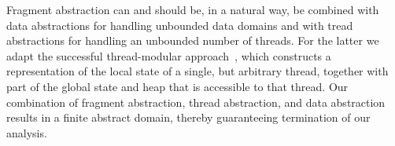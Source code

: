 Fragment abstraction can and should be, in a natural way,
be combined with data abstractions for
handling unbounded data domains and with tread abstractions
for handling an unbounded number of threads.
For the latter we adapt
the successful thread-modular approach~\cite{BLMRS:cav08}, which constructs
a representation of the local state of a single, but arbitrary thread, together
with part of the global state and heap that is accessible to that thread.
Our combination of fragment abstraction, thread abstraction, and data
abstraction results in a finite abstract domain, thereby guaranteeing
termination of our analysis.





